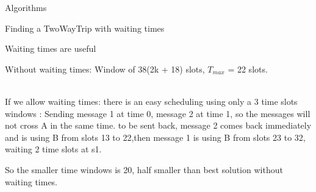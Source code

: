\documentclass[a4paper,10pt]{report}
\begin{document}
\begin{chapter}{Algorithms}
\begin{section}{Finding a TwoWayTrip with waiting times}
\begin{subsection}{Waiting times are useful}
{{{
  } 
  Without waiting times: Window of 38(2k + 18) slots, $T_{max}$ = 22 slots.
  }}\\
 


If we allow waiting times: there is an easy scheduling using only a 3 time slots windows : 
Sending message 1 at time 0, message 2 at time 1, so the messages will not cross A in the same time. to be sent back,
message 2 comes back immediately and is using B from slots 13 to 22,then message 1 is using B from slots 23 to 32, waiting 2 time slots at s1.

So the smaller time windows is 20, half smaller than best solution without waiting times.\\

\end{subsection}
\end{section}
\end{chapter}
\end{document}
